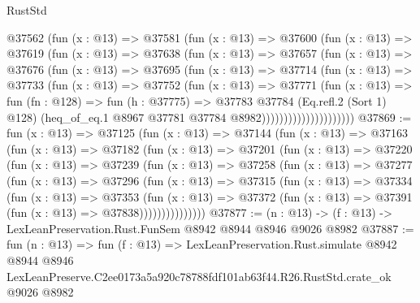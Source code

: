 \begin{lexlean}{RustStd}
\begin{coremodule}
                  @37562
                    (fun (x : @13) =>
                    @37581
                      (fun (x : @13) =>
                      @37600
                        (fun (x : @13) =>
                        @37619
                          (fun (x : @13) =>
                          @37638
                            (fun (x : @13) =>
                            @37657
                              (fun (x : @13) =>
                              @37676
                                (fun (x : @13) =>
                                @37695
                                  (fun (x : @13) =>
                                  @37714
                                    (fun (x : @13) =>
                                    @37733
                                      (fun (x : @13) =>
                                      @37752
                                        (fun (x : @13) =>
                                        @37771
                                          (fun (x : @13) =>
                                          fun (fn : @128) =>
                                          fun (h : @37775) =>
                                          @37783
                                            @37784
                                            (Eq.refl.{2} (Sort 1) @128)
                                            (heq_of_eq.{1}
                                              @8967
                                              @37781
                                              @37784
                                              @8982)))))))))))))))))))))
@37869 := fun (x : @13) =>
  @37125
    (fun (x : @13) =>
    @37144
      (fun (x : @13) =>
      @37163
        (fun (x : @13) =>
        @37182
          (fun (x : @13) =>
          @37201
            (fun (x : @13) =>
            @37220
              (fun (x : @13) =>
              @37239
                (fun (x : @13) =>
                @37258
                  (fun (x : @13) =>
                  @37277
                    (fun (x : @13) =>
                    @37296
                      (fun (x : @13) =>
                      @37315
                        (fun (x : @13) =>
                        @37334
                          (fun (x : @13) =>
                          @37353
                            (fun (x : @13) =>
                            @37372 (fun (x : @13) => @37391 (fun (x : @13) => @37838)))))))))))))))
@37877 := (n : @13) -> (f : @13) -> LexLeanPreservation.Rust.FunSem @8942 @8944 @8946 @9026 @8982
@37887 := fun (n : @13) =>
  fun (f : @13) =>
  LexLeanPreservation.Rust.simulate
    @8942
    @8944
    @8946
    LexLeanPreserve.C2ee0173a5a920c78788fdf101ab63f44.R26.RustStd.crate_ok
    @9026
    @8982
\end{coremodule}
\end{lexlean}
